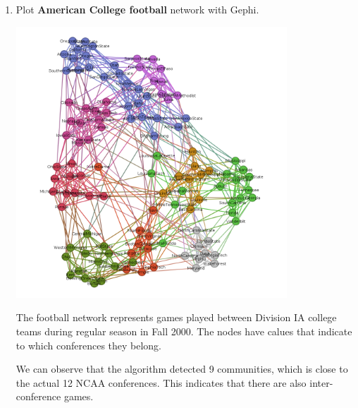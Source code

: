 \documentclass{amsart}
\theoremstyle{definition}
\theoremstyle{remark}
\numberwithin{equation}{section}
\begin{document}
\begin{enumerate}
\begin{enumerate}
        \item Plot \textbf{American College football} network with Gephi. \vspace{0.5 cm}
        \centering
        \begin{minipage}{1\textwidth}
        \centering
        \includegraphics[width=0.8\textwidth]{images/football_v0.png} %
        \end{minipage}


        The football network represents games played between Division IA college teams during regular season in Fall 2000. The nodes have calues that indicate to which conferences they belong.
        
        We can observe that the algorithm detected 9 communities, which is close to the actual 12 NCAA conferences. This indicates that there are also inter-conference games. 

        \vspace{0.5 cm}


\end{enumerate}
\end{enumerate}
\end{document}
